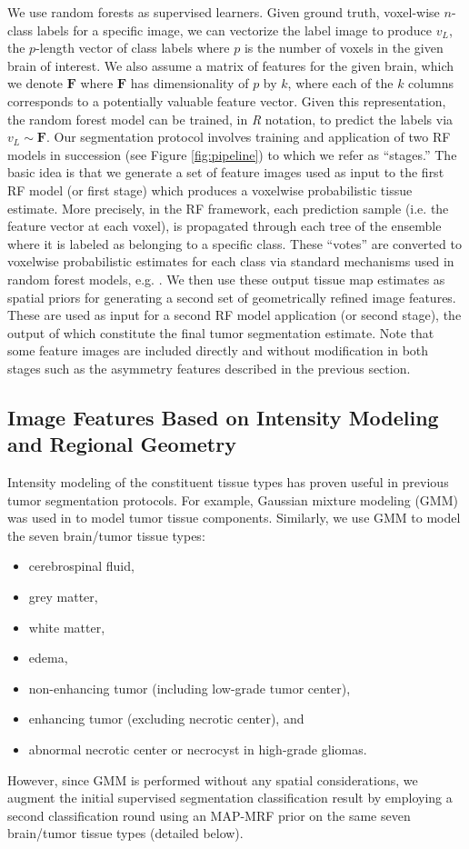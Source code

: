 \documentclass[preprint,authoryear,review,12pt]{elsarticle}
\begin{document}
We use random forests as supervised learners.  Given ground truth,
voxel-wise $n$-class labels for a specific image, we can vectorize the
label image to produce $v_L$, the $p$-length vector of class labels
where $p$ is the number of voxels in the given brain of interest.
We also assume a matrix of features for the given brain, which we
denote $\bm{F}$ where $\bm{F}$ has dimensionality of $p$ by
$k$, where each of the $k$ columns corresponds to a potentially valuable
feature vector.  Given this representation, the random forest model
can be trained, in \textit{R} notation, to predict the labels via
$v_L \sim  \bm{F}$.
Our segmentation protocol involves training and application
of two RF models in succession 
(see Figure \ref{fig:pipeline}) to which we refer as ``stages.''  The basic idea is that
we generate a set of feature images used as input to the
first RF model (or first stage) which produces a voxelwise 
probabilistic tissue estimate.  More precisely, in the RF framework, each prediction sample (i.e. the feature vector at each voxel),
is propagated through each tree of the ensemble where it is labeled as belonging to a specific
class.  
These ``votes'' are converted to voxelwise probabilistic
estimates for each class via standard mechanisms used in random forest
models, e.g. \cite{liaw2002}.
We then use these output tissue map estimates as spatial 
priors for generating a second set of geometrically refined image features.  These
are used as input for a second RF model application (or
second stage),
the output of which constitute the final tumor segmentation estimate.
Note that some feature images are included directly and
  without modification in both stages such as
the asymmetry features described in the previous section.


\subsection{Image Features Based on Intensity Modeling and Regional Geometry}

Intensity modeling of the constituent tissue types has proven
useful in previous tumor segmentation protocols.  For example,
Gaussian mixture modeling (GMM) was used in \citep{bauer2012,zikic2012} to model
tumor tissue components.  Similarly, we use GMM to model 
the seven brain/tumor tissue types:
\begin{itemize}
\item cerebrospinal fluid,
\item grey matter,
\item white matter,
\item edema, 
\item non-enhancing tumor (including low-grade tumor center), 
\item enhancing tumor (excluding necrotic center), and 
\item abnormal necrotic center or necrocyst in high-grade gliomas.
\end{itemize}
However, since GMM is performed without any spatial 
considerations, we augment the initial supervised segmentation 
classification result by employing a second classification round
using an MAP-MRF prior on the same seven brain/tumor tissue types
(detailed below).
\end{document}
